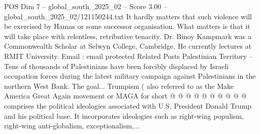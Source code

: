 \begin{textsample}{POS Dim 7 – global\_south\_2025\_02 – Score 3.00 – global\_south\_2025\_02/121150244.txt}
It hardly matters that such violence will be exercised by Hamas or some successor organisation.
What matters is that it will take place with relentless, retributive tenacity.
Dr.
Binoy Kampmark was a Commonwealth Scholar at Selwyn College, Cambridge.
He currently lectures at RMIT University.
Email : email protected Related Posts Palestinian Territory -- Tens of thousands of Palestinians have been forcibly displaced by Israeli occupation forces during the latest military campaign against Palestinians in the northern West Bank.
The goal...
Trumpism ( also referred to as the Make America Great Again movement or MAGA for short @ @ @ @ @ @ @ @ @ @ comprises the political ideologies associated with U.S.
President Donald Trump and his political base.
It incorporates ideologies such as right-wing populism, right-wing anti-globalism, exceptionalism,...

\end{textsample}
